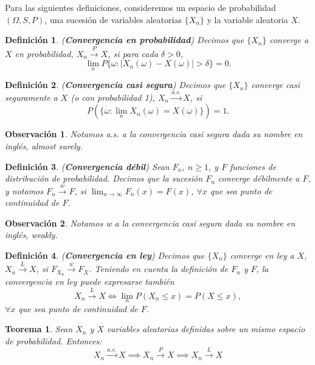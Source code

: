 \documentclass{report}
\newtheorem{thm}{Teorema}[section]
\newtheorem{dfn}{Definición}[section]
\newtheorem{obs}{Observación}[section]
\begin{document}
Para las siguientes definiciones, consideremos un espacio de probabilidad $(\Omega, S, P)$, 
una sucesión de variables aleatorias $\{X_n\}$ y la variable aleatoria $X$.

\begin{dfn} \label{dfn:conv_prob} (\textbf{Convergencia en probabilidad}) 
    Decimos que $\{X_n\}$ converge a $X$ en probabilidad, $X_n \xrightarrow{P} X$, si para cada $\delta > 0$,
\[
\lim_{n} P\{\omega : |X_n(\omega) - X(\omega)| > \delta \} = 0.
\]
\end{dfn}

\begin{dfn} \label{dfn:conv_cs}(\textbf{Convergencia casi segura}) Decimos que $\{X_n\}$ converge casi seguramente a $X$ (o con probabilidad 1), $X_n \xrightarrow{a.s.} X$, si
\[
P(\{\omega : \lim_{n} X_n(\omega) = X(\omega)\}) = 1.
\]
\end{dfn}
\begin{obs}
    Notamos \emph{a.s.} a la convergencia casi segura dada su nombre en inglés, \emph{almost surely}. 
\end{obs}

\begin{dfn} \label{dfn:conv_debil} (\textbf{Convergencia débil}) Sean $F_n$, $n \geq 1$, y 
    $F$ funciones de distribución de probabilidad. Decimos que la sucesión $F_n$ converge \emph{débilmente} a $F$, y notamos $F_n \xrightarrow{w} F$, 
    si $\displaystyle\lim_{n\rightarrow\infty} F_n(x) = F(x)$, $\forall x$ que sea punto de continuidad de $F$.
\end{dfn}

\begin{obs}
    Notamos \emph{w} a la convergencia casi segura dada su nombre en inglés, \emph{weakly}. 
\end{obs}


\begin{dfn} \label{dfn:conv_ley} (\textbf{Convergencia en ley}) Decimos que $\{X_n\}$ converge en ley a $X$, 
    $X_n \xrightarrow{L} X$, si $F_{X_n} \xrightarrow{w} F_X$. Teniendo en cuenta la definición de $F_n$ y $F$, la convergencia en ley puede expresarse también
\[
X_n \xrightarrow{L} X \iff \lim_n P(X_n \leq x) = P(X \leq x),
\]
$\forall x$ que sea punto de continuidad de $F$.
\end{dfn}


\begin{thm} \label{thm:rel_convergencias}  Sean $X_n$ y $X$ variables aleatorias definidas sobre un mismo espacio de probabilidad. Entonces:
\[
X_n \xrightarrow{a.s.} X \implies X_n \xrightarrow{P} X \implies X_n \xrightarrow{L} X
\]
\end{thm}
\end{document}
